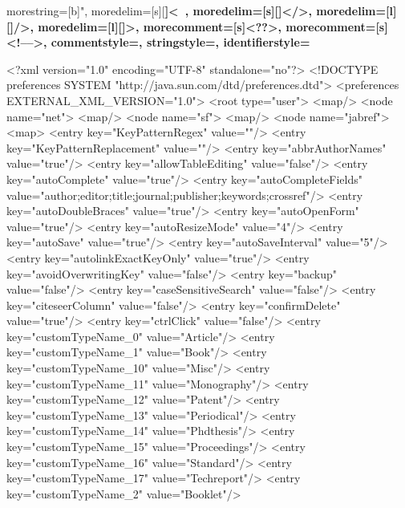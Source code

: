 {
  morestring=[b]",
  moredelim=[s][\bfseries\color{maroon}]{<}{\ },
  moredelim=[s][\bfseries\color{maroon}]{</}{>},
  moredelim=[l][\bfseries\color{maroon}]{/>},
  moredelim=[l][\bfseries\color{maroon}]{>},
  morecomment=[s]{<?}{?>},
  morecomment=[s]{<!--}{-->},
  commentstyle=\color{darkgreen},
  stringstyle=\color{blue},
  identifierstyle=\color{red}
}


\begin{codigo}[caption={Código de configuração do programa JabRef em XML}, label={codigo:config-jabref}, language=XML, breaklines=true]
<?xml version="1.0" encoding="UTF-8" standalone="no"?>
<!DOCTYPE preferences SYSTEM "http://java.sun.com/dtd/preferences.dtd">
<preferences EXTERNAL_XML_VERSION="1.0">
  <root type="user">
    <map/>
    <node name="net">
      <map/>
      <node name="sf">
        <map/>
        <node name="jabref">
          <map>
            <entry key="KeyPatternRegex" value=""/>
            <entry key="KeyPatternReplacement" value=""/>
            <entry key="abbrAuthorNames" value="true"/>
            <entry key="allowTableEditing" value="false"/>
            <entry key="autoComplete" value="true"/>
            <entry key="autoCompleteFields" value="author;editor;title;journal;publisher;keywords;crossref"/>
            <entry key="autoDoubleBraces" value="true"/>
            <entry key="autoOpenForm" value="true"/>
            <entry key="autoResizeMode" value="4"/>
            <entry key="autoSave" value="true"/>
            <entry key="autoSaveInterval" value="5"/>
            <entry key="autolinkExactKeyOnly" value="true"/>
            <entry key="avoidOverwritingKey" value="false"/>
            <entry key="backup" value="false"/>
            <entry key="caseSensitiveSearch" value="false"/>
            <entry key="citeseerColumn" value="false"/>
            <entry key="confirmDelete" value="true"/>
            <entry key="ctrlClick" value="false"/>
            <entry key="customTypeName_0" value="Article"/>
            <entry key="customTypeName_1" value="Book"/>
            <entry key="customTypeName_10" value="Misc"/>
            <entry key="customTypeName_11" value="Monography"/>
            <entry key="customTypeName_12" value="Patent"/>
            <entry key="customTypeName_13" value="Periodical"/>
            <entry key="customTypeName_14" value="Phdthesis"/>
            <entry key="customTypeName_15" value="Proceedings"/>
            <entry key="customTypeName_16" value="Standard"/>
            <entry key="customTypeName_17" value="Techreport"/>
            <entry key="customTypeName_2" value="Booklet"/>

\end{codigo}
